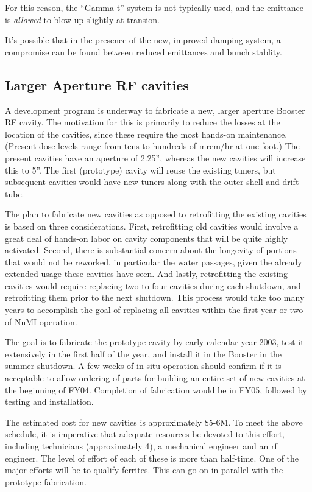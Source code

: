 \documentclass{article}
\begin{document}
For this reason, the ``Gamma-t''  system is not 
typically used, and the emittance is {\em allowed} to blow
up slightly at transion.

It's possible that in the presence of the new, improved
damping system, a compromise can be found between reduced
emittances and bunch stablity.

\subsection {Larger Aperture RF cavities}

A development program is underway to fabricate a new, larger aperture Booster 
RF cavity.  The motivation for this is primarily to reduce the losses at the 
location of the cavities, since these 
require the most hands-on maintenance.  (Present dose levels range from tens 
to hundreds of mrem/hr at one foot.)  The present cavities have an aperture 
of 2.25'', whereas the new cavities will increase this to 5''.  The first
(prototype) cavity will reuse the existing tuners, but subsequent cavities 
would have new tuners along with the outer shell and drift tube.

The plan to fabricate new cavities as opposed to retrofitting the existing 
cavities is based on three considerations.  First, retrofitting old cavities 
would involve a great deal of hands-on labor on cavity components that will 
be quite highly activated.
Second, there is substantial concern about the longevity of 
portions that would not be reworked, in particular the water passages, given 
the already extended usage these cavities have seen.  And lastly, retrofitting
the existing cavities would require replacing two to four cavities 
during each shutdown, and retrofitting them prior to the next shutdown.  This 
process would take too many years to accomplish the goal of replacing all 
cavities within the first year or two of NuMI operation.  

The goal is to fabricate the prototype cavity by early calendar year 2003, 
test it extensively in the first half of the year, and install it in the 
Booster in the summer shutdown.  A few weeks of in-situ operation should 
confirm if it is acceptable to allow ordering of parts for building an entire 
set of new cavities at the beginning of FY04.  Completion of fabrication 
would be in FY05, followed by testing and installation.

The estimated cost for new cavities is approximately \$5-6M.  To meet the above
schedule, it is imperative that adequate resources be devoted to this effort, 
including technicians (approximately 4), a mechanical engineer and an rf 
engineer.  The level of effort of each of these is more than half-time.  One 
of the major efforts will be to qualify ferrites.  This can go on in parallel 
with the prototype fabrication.  
\end{document}
